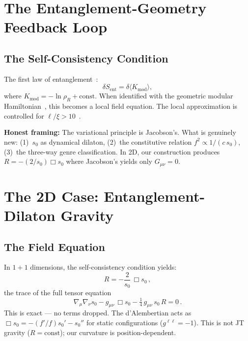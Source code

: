 \documentclass[aps,prd,twocolumn,superscriptaddress,nofootinbib,floatfix]{revtex4-2}
\newcommand{\sn}{s_0}
\newcommand{\Kmod}{K_{\mathrm{mod}}}
\newcommand{\Sent}{S_{\mathrm{ent}}}
\newcommand{\dAlem}{\Box}
\begin{document}
\section{The Entanglement-Geometry Feedback Loop}
\label{sec:feedback}

\subsection{The Self-Consistency Condition}

The first law of entanglement~\cite{Lashkari2014,BlancoCasiniHungMyers2013,JLMS2016}:
\begin{equation}
\delta\Sent = \delta\langle\Kmod\rangle,
\end{equation}
where $\Kmod = -\ln\rho_R + \text{const}$. When identified with the geometric modular Hamiltonian~\cite{BisognanoWichmann1976,CasiniHuertaMyers2011}, this becomes a local field equation. The local approximation is controlled for $\ell/\xi > 10$~\cite{Dalmonte2018}.

\textbf{Honest framing:} The variational principle is Jacobson's. What is genuinely new: (1)~$\sn$ as dynamical dilaton, (2)~the constitutive relation $f^2 \propto 1/(c\,\sn)$, (3)~the three-way genre classification. In 2D, our construction produces $R = -(2/\sn)\dAlem\sn$ where Jacobson's yields only $G_{\mu\nu} = 0$.

\section{The 2D Case: Entanglement-Dilaton Gravity}
\label{sec:2D}

\subsection{The Field Equation}

In $1{+}1$ dimensions, the self-consistency condition yields:
\begin{equation}
\label{eq:fieldeq}
R = -\frac{2}{\sn}\,\dAlem\sn\,,
\end{equation}
the trace of the full tensor equation
\begin{equation}
\label{eq:tensoreq}
\nabla_\mu\nabla_\nu\sn - g_{\mu\nu}\,\dAlem\sn - \tfrac{1}{4}\,g_{\mu\nu}\,\sn\,R = 0\,.
\end{equation}
This is exact --- no terms dropped. The d'Alembertian acts as $\dAlem\sn = -(f'/f)\sn' - \sn''$ for static configurations ($g^{\ell\ell} = -1$). This is not JT gravity ($R = \text{const}$); our curvature is position-dependent.
\end{document}

